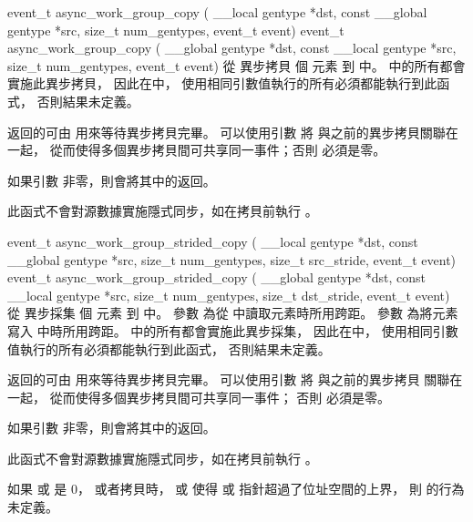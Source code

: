 event_t async_work_group_copy ( 
	__local gentype *dst, 
	const __global gentype *src, 
	size_t num_gentypes, 
	event_t event) 
event_t async_work_group_copy (
	__global gentype *dst,
	const __local gentype *src,
	size_t num_gentypes,
	event_t event)
\stopbuffer
{}
從  異步拷貝  個  元素
到  中。
中的所有都會實施此異步拷貝，
因此在中，
使用相同引數值執行的所有必須都能執行到此函式，
否則結果未定義。

返回的可由  用來等待異步拷貝完畢。
可以使用引數  將  與之前的異步拷貝關聯在一起，
從而使得多個異步拷貝間可共享同一事件；否則  必須是零。

如果引數  非零，則會將其中的返回。

此函式不會對源數據實施隱式同步，如在拷貝前執行 。
\stopbuffer

event_t async_work_group_strided_copy (
	__local gentype *dst,
	const __global gentype *src,
	size_t num_gentypes,
	size_t src_stride,
	event_t event)
event_t async_work_group_strided_copy (
	__global gentype *dst,
	const __local gentype *src,
	size_t num_gentypes,
	size_t dst_stride,
	event_t event)
\stopbuffer
{}
從  異步採集  個  元素
到  中。
參數  為從  中讀取元素時所用跨距。
參數  為將元素寫入  中時所用跨距。
中的所有都會實施此異步採集，
因此在中，
使用相同引數值執行的所有必須都能執行到此函式，
否則結果未定義。

返回的可由  用來等待異步拷貝完畢。
可以使用引數  將  與之前的異步拷貝
關聯在一起，
從而使得多個異步拷貝間可共享同一事件；
否則  必須是零。

如果引數  非零，則會將其中的返回。

此函式不會對源數據實施隱式同步，如在拷貝前執行 。

如果  或  是 0，
或者拷貝時，  或  使得
  或  指針超過了位址空間的上界，
則  的行為未定義。
\stopbuffer

